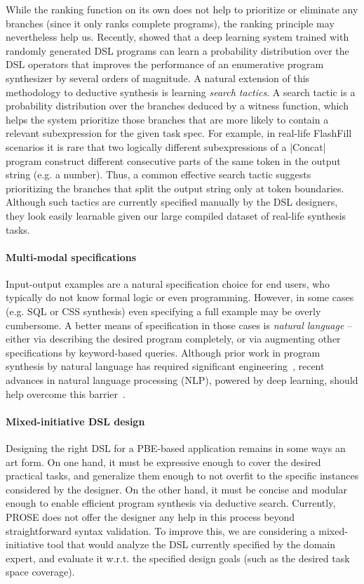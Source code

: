 While the ranking function on its own does not help to prioritize or eliminate any branches (since it only ranks
complete programs), the ranking principle may nevertheless help us.
Recently, \citet{deepcoder} showed that a deep learning system trained with randomly generated DSL programs can learn a
probability distribution over the DSL operators that improves the performance of an enumerative program synthesizer by
several orders of magnitude.
A natural extension of this methodology to deductive synthesis is learning \emph{search tactics}.
A search tactic is a probability distribution over the branches deduced by a witness function, which helps the system
prioritize those branches that are more likely to contain a relevant subexpression for the given task spec.
For example, in real-life FlashFill scenarios it is rare that two logically different subexpressions of a
\dslinline|Concat| program construct different consecutive parts of the same token in the output string (e.g. a number).
Thus, a common effective search tactic suggests prioritizing the branches that split the output string only at token
boundaries.
Although such tactics are currently specified manually by the DSL designers, they look easily learnable given our
large compiled dataset of real-life synthesis tasks.

\paragraph{Multi-modal specifications}
Input-output examples are a natural specification choice for end users, who typically do not know formal logic or even
programming.
However, in some cases (e.g. SQL or CSS synthesis) even specifying a full example may be overly cumbersome.
A better means of specification in those cases is \emph{natural language} -- either via describing the desired program
completely, or via augmenting other specifications by keyword-based queries.
Although prior work in program synthesis by natural language has required significant
engineering~\cite{nlyze}, recent advances in natural language processing (NLP), powered by deep
learning, should help overcome this barrier~\cite{quirk2015language}.

\paragraph{Mixed-initiative DSL design}
Designing the right DSL for a PBE-based application remains in some ways an art form.
On one hand, it must be expressive enough to cover the desired practical tasks, and generalize them enough to not
overfit to the specific instances considered by the designer.
On the other hand, it must be concise and modular enough to enable efficient program synthesis via deductive search.
Currently, PROSE does not offer the designer any help in this process beyond straightforward syntax validation.
To improve this, we are considering a mixed-initiative tool that would analyze the DSL currently specified by
the domain expert, and evaluate it w.r.t. the specified design goals (such as the desired task space coverage).
